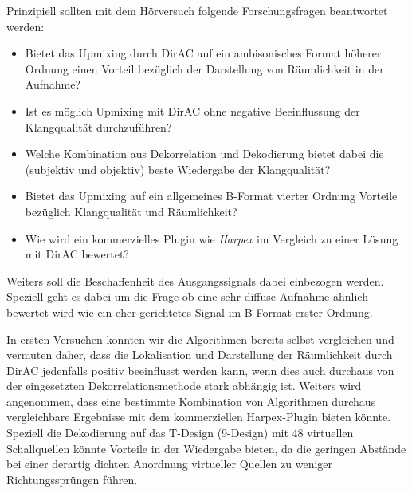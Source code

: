 Prinzipiell sollten mit dem Hörversuch folgende Forschungsfragen beantwortet werden:

\begin{itemize}
	\item Bietet das Upmixing durch DirAC auf ein ambisonisches Format höherer Ordnung einen Vorteil bezüglich der Darstellung von Räumlichkeit in der Aufnahme?
	\item Ist es möglich Upmixing mit DirAC ohne negative Beeinflussung der Klangqualität durchzuführen?
	\item Welche Kombination aus Dekorrelation und Dekodierung bietet dabei die (subjektiv und objektiv) beste Wiedergabe der Klangqualität?
	\item Bietet das Upmixing auf ein allgemeines B-Format vierter Ordnung Vorteile bezüglich Klangqualität und Räumlichkeit?
	\item Wie wird ein kommerzielles Plugin wie \textit{Harpex} im Vergleich zu einer Lösung mit DirAC bewertet?
\end{itemize}

Weiters soll die Beschaffenheit des Ausgangssignals dabei einbezogen werden. Speziell geht es dabei um die Frage ob eine sehr diffuse Aufnahme ähnlich bewertet wird wie ein eher gerichtetes Signal im B-Format erster Ordnung.

In ersten Versuchen konnten wir die Algorithmen bereits selbst vergleichen und vermuten daher, dass die Lokalisation und Darstellung der Räumlichkeit durch DirAC jedenfalls positiv beeinflusst werden kann, wenn dies auch durchaus von der eingesetzten Dekorrelationsmethode stark abhängig ist. Weiters wird angenommen, dass eine bestimmte Kombination von Algorithmen durchaus vergleichbare Ergebnisse mit dem kommerziellen Harpex-Plugin bieten könnte. Speziell die Dekodierung auf das T-Design (9-Design) mit 48 virtuellen Schallquellen könnte Vorteile in der Wiedergabe bieten, da die geringen Abstände bei einer derartig dichten Anordnung virtueller Quellen zu weniger Richtungssprüngen führen.